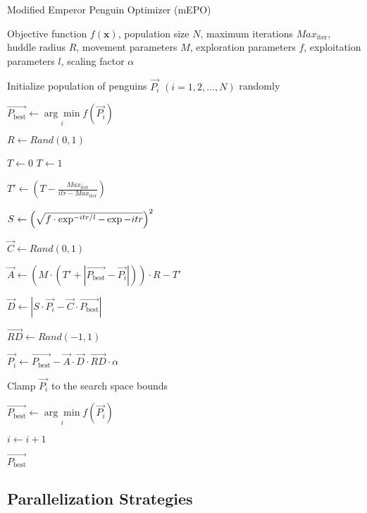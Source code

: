 \begin{algorithm}[H]
    \caption{Modified Emperor Penguin Optimizer (mEPO)}
    \label{alg:ourepo}
    \begin{algorithmic}[1]
    \Require Objective function $f(\mathbf{x})$, population size $N$, maximum iterations $Max_{\text{iter}}$, huddle radius $R$, movement parameters $M$, exploration parameters $f$, exploitation parameters $l$, scaling factor $\alpha$
    
    \State Initialize population of penguins $\vec{P_i}$ $(i = 1, 2, \dots, N)$ randomly

    \State $\vec{P_{\text{best}}} \gets \underset{i}{\arg\min} f(\vec{P_i})$ 
    
        \State $R \gets Rand(0, 1)$ 
        
            \State $T \gets 0$
        \Else
            \State $T \gets 1$
        \EndIf

        \State $T' \gets (T - \frac{Max_{\text{iter}}}{itr - Max_{\text{iter}}})$ 

        \State $S \gets \Bigl(\sqrt{f\cdot\exp^{-itr/l}-\exp{-itr}}\Bigr)^2$ 

            \State $\vec{C} \gets Rand(0, 1)$ 
            
            \State $\vec{A} \gets (M \cdot (T' + |\vec{P_{\text{best}}} - \vec{P_i}|)) \cdot R - T'$ 

            \State $\vec{D} \gets |S \cdot \vec{P_i} - \vec{C} \cdot \vec{P_{\text{best}}}|$ 

            \State $\vec{RD} \gets Rand(-1, 1)$ 
            
            \State $\vec{P_i} \gets \vec{P_{\text{best}}} - \vec{A} \cdot \vec{D} \cdot \vec{RD} \cdot \alpha$
            
            \State Clamp $\vec{P_i}$ to the search space bounds
        \EndFor

         

            \State $\vec{P_{\text{best}}} \gets \underset{i}{\arg\min} f(\vec{P_i})$ 
        \EndIf

        \State $i \gets i + 1$
    \EndWhile
  
    \State \Return $\vec{P_{\text{best}}}$

    \end{algorithmic}
\end{algorithm}


\subsection{Parallelization Strategies}


